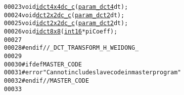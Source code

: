 \begin{footnotesize}
\begin{alltt}
00023 \textcolor{keywordtype}{void} \hyperlink{_d_c_t_transform_8cpp_ac50d1e85c45ad67944176f8ce8219dba}{idct4x4dc_c}(\hyperlink{_d_c_t_transform_8h_adee5aa91ada08f440eadac1fa5dea16f}{param_dct4} dt);
00024 \textcolor{keywordtype}{void} \hyperlink{_d_c_t_transform_8cpp_a98ecb204463bfa1a4588349447a79250}{dct2x2dc_c}(\hyperlink{_d_c_t_transform_8h_abace759df68d8f1dcf808ffac7ed39c8}{param_dct2} dt);
00025 \textcolor{keywordtype}{void} \hyperlink{_d_c_t_transform_8cpp_ada208d2366935100bdc2375bec45cc8f}{idct2x2dc_c}(\hyperlink{_d_c_t_transform_8h_abace759df68d8f1dcf808ffac7ed39c8}{param_dct2} dt);
00026 \textcolor{keywordtype}{void} \hyperlink{_d_c_t_transform_8cpp_aab666ffcda45ced06a5b5853c52c94bf}{idct8x8}(\hyperlink{_types_8h_a259fa4834387bd68627ddf37bb3ebdb9}{int16} *piCoeff );
00027 
00028 \textcolor{preprocessor}{#endif //\_DCT\_TRANSFORM\_H\_WEIDONG\_}
00029 \textcolor{preprocessor}{}
00030 \textcolor{preprocessor}{#ifdef MASTER\_CODE}
00031 \textcolor{preprocessor}{}\textcolor{preprocessor}{#error "Can not include slave code in master program"}
00032 \textcolor{preprocessor}{}\textcolor{preprocessor}{#endif // MASTER\_CODE}
00033 \textcolor{preprocessor}{}
\end{alltt}\end{footnotesize}

